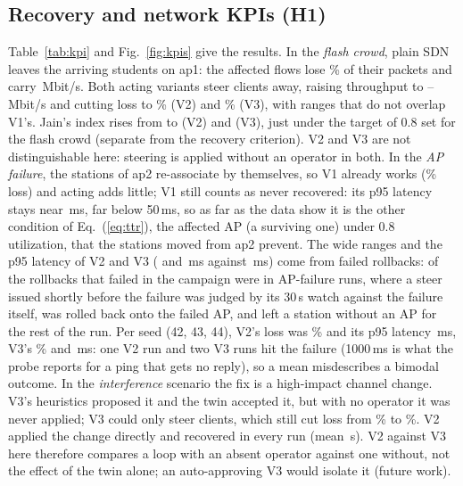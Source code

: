 \documentclass[conference]{IEEEtran}
\begin{document}
\subsection{Recovery and network KPIs (H1)}
Table~\ref{tab:kpi} and Fig.~\ref{fig:kpis} give the results. In the \emph{flash crowd}, plain SDN leaves the arriving students on ap1: the affected flows lose \KpiFlashLossVone\% of their packets and carry \KpiFlashThrVone\,Mbit/s. Both acting variants steer clients away, raising throughput to \KpiFlashThrVtwo--\KpiFlashThrVthree\,Mbit/s and cutting loss to \KpiFlashLossVtwo\% (V2) and \KpiFlashLossVthree\% (V3), with ranges that do not overlap V1's. Jain's index rises from \FairJainVone{} to \FairJainVtwo{} (V2) and \FairJainVthree{} (V3), just under the target of 0.8 set for the flash crowd (separate from the recovery criterion). V2 and V3 are not distinguishable here: steering is applied without an operator in both. In the \emph{AP failure}, the stations of ap2 re-associate by themselves, so V1 already works (\KpiApFailLossVone\% loss) and acting adds little; V1 still counts as never recovered: its p95 latency stays near \KpiApFailLatVone\,ms, far below 50\,ms, so as far as the data show it is the other condition of Eq.~(\ref{eq:ttr}), the affected AP (a surviving one) under 0.8 utilization, that the stations moved from ap2 prevent. The wide ranges and the p95 latency of V2 and V3 (\KpiApFailLatVtwo{} and \KpiApFailLatVthree\,ms against \KpiApFailLatVone\,ms) come from failed rollbacks: \RbFailApFail{} of the \RbFailAll{} rollbacks that failed in the campaign were in AP-failure runs, where a steer issued shortly before the failure was judged by its 30\,s watch against the failure itself, was rolled back onto the failed AP, and left a station without an AP for the rest of the run. Per seed (42, 43, 44), V2's loss was \PerSeedLossApFailVtwo\% and its p95 latency \PerSeedLatApFailVtwo\,ms, V3's \PerSeedLossApFailVthree\% and \PerSeedLatApFailVthree\,ms: one V2 run and two V3 runs hit the failure (1000\,ms is what the probe reports for a ping that gets no reply), so a mean misdescribes a bimodal outcome. In the \emph{interference} scenario the fix is a high-impact channel change. V3's heuristics proposed it and the twin accepted it, but with no operator it was never applied; V3 could only steer clients, which still cut loss from \KpiCochanLossVone\% to \KpiCochanLossVthree\%. V2 applied the change directly and recovered in every run (mean \KpiCochanTtrVtwo\,s). V2 against V3 here therefore compares a loop with an absent operator against one without, not the effect of the twin alone; an auto-approving V3 would isolate it (future work).
\end{document}

